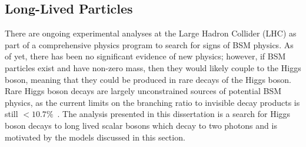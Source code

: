 \subsection{Long-Lived Particles} \label{sec:LLPs}
There are ongoing experimental analyses at the Large Hadron Collider (LHC) as part of a comprehensive physics program to search for signs of BSM physics. As of yet, there has been no significant evidence of new physics; however, if BSM particles exist and have non-zero mass, then they would likely couple to the Higgs boson, meaning that they could be produced in rare decays of the Higgs boson. Rare Higgs boson decays are largely unconstrained sources of potential BSM physics, as the current limits on the branching ratio to invisible decay products is still $<10.7\%$~\cite{pdg2024}. The analysis presented in this dissertation is a search for Higgs boson decays to long lived scalar bosons which decay to two photons and is motivated by the models discussed in this section.

